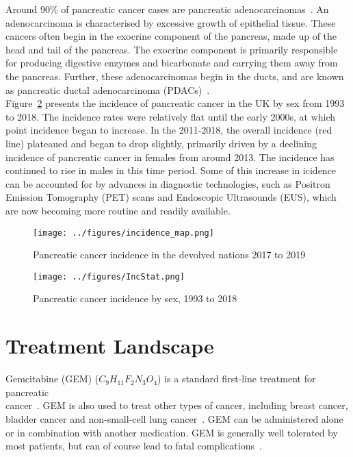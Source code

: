 Around 90\% of pancreatic cancer cases are pancreatic adenocarcinomas~\cite{pishvaian}. An adenocarcinoma is characterised by excessive growth of epithelial tissue. These cancers often begin in the exocrine component of the pancreas, made up of the head and tail of the pancreas. The exocrine component is primarily responsible for producing digestive enzymes and bicarbonate and carrying them away from the pancreas. Further, these adenocarcinomas begin in the ducts, and are known as pancreatic ductal adenocarcinoma (PDACs)~\cite{neoptolemos}. \\

Figure~\ref{pancInc} presents the incidence of pancreatic cancer in the UK by sex from 1993 to 2018. The incidence rates were relatively flat until the early 2000s, at which point incidence began to increase. In the 2011-2018, the overall incidence (red line) plateaued and began to drop slightly, primarily driven by a declining incidence of pancreatic cancer in females from around 2013. The incidence has continued to rise in males in this time period. Some of this increase in icidence can be accounted for by advances in diagnostic technologies, such as Positron Emission Tomography (PET) scans and Endoscopic Ultrasounds (EUS), which are now becoming more routine and readily available. \\

\begin{figure}[h]
    \centering
    \texttt{[image: ../figures/incidence\_map.png]}
    \caption{Pancreatic cancer incidence in the devolved nations 2017 to 2019}
    \label{pancIncMap}
\end{figure}

\begin{figure}[h]
    \centering
    \texttt{[image: ../figures/IncStat.png]}
    \caption{Pancreatic cancer incidence by sex, 1993 to 2018}
    \label{pancInc}
\end{figure}

\section{Treatment Landscape}
Gemcitabine (GEM) ($C_9H_{11}F_2N_3O_4$) is a standard first-line treatment for pancreatic\\ cancer~\cite{TA25}. GEM is also used to treat other types of cancer, including breast cancer, bladder cancer and non-small-cell lung cancer~\cite{wong2009}. GEM can be administered alone or in combination with another medication. GEM is generally well tolerated by most patients, but can of course lead to fatal complications~\cite{hryciuk}.  \\

